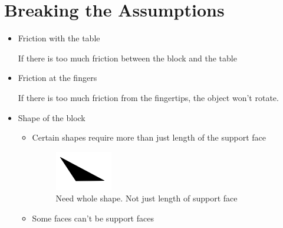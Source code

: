 \documentclass{article}
\begin{document}
\section{Breaking the Assumptions}

\begin{itemize}

  \item Friction with the table 

    If there is too much friction between the block and the table 

  \item Friction at the fingers

    If there is too much friction from the fingertips, the object won't rotate.

  \item Shape of the block 
    \begin{itemize}
    \item Certain shapes require more than just length of the support face

    \begin{figure}[h!]
      \centering
      \includegraphics[width=0.25\textwidth]{triangle_failure.png}
      \caption{Need whole shape. Not just length of support face}
    \end{figure}

    \item Some faces can't be support faces


\end{itemize}
\end{itemize}
\end{document}
